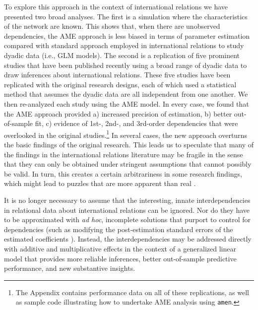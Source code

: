 To explore this approach in the context of international relations we have presented two broad analyses. The first is a simulation where the characteristics of the network are known. This shows that, when there are unobserved dependencies, the AME approach is less biased in terms of parameter estimation compared with standard approach employed in international relations to study dyadic data (i.e., GLM models). The second is a replication of five prominent studies that have been published recently using a broad range of dyadic data to draw inferences about international relations.  These five studies have been replicated with the original research designs, each of which used a statistical method that assumes the dyadic data are all independent from one another.  We then re-analyzed each study using the AME model.  In every case, we found that the AME approach provided a) increased precision of estimation, b) better out-of-sample fit, c) evidence of 1st-, 2nd-, and 3rd-order dependencies that were overlooked in the original studies.\footnote{The Appendix contains performance data on all of these replications, as well as sample code illustrating how to undertake AME analysis using \texttt{amen}.} In several cases, the new approach overturns the basic findings of the original research.  This leads us to speculate that many of the findings in the international relations literature may be fragile in the sense that they can only be obtained under stringent assumptions that cannot possibly be valid.  In turn, this creates a certain arbitrariness in some research findings, which might lead to puzzles that are more apparent than real \citep{zinnes:1980}.  

It is no longer necessary to assume that the interesting, innate interdependencies in relational data about international relations can be ignored. Nor do they have to be approximated with \textit{ad hoc}, incomplete solutions that purport to control for dependencies (such as modifying the post-estimation standard errors of the estimated coefficients \citep{king:roberts:2014}). Instead, the interdependencies may be addressed directly with additive and multiplicative effects in the context of a generalized linear model that provides more reliable inferences, better out-of-sample predictive performance, and new substantive insights. 


